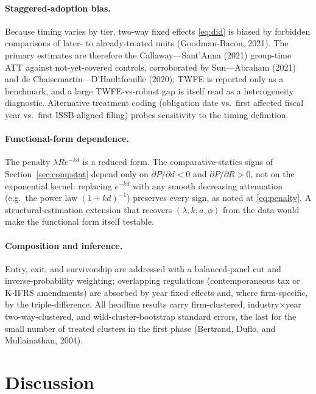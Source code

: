 \documentclass[11pt,a4paper]{article}
\begin{document}
\paragraph{Staggered-adoption bias.} Because timing varies by tier, two-way fixed effects \eqref{eq:did} is biased by forbidden comparisons of later- to already-treated units (Goodman-Bacon, 2021). The primary estimates are therefore the Callaway---Sant'Anna (2021) group-time ATT against not-yet-covered controls, corroborated by Sun---Abraham (2021) and de Chaisemartin---D'Haultf\oe uille (2020); TWFE is reported only as a benchmark, and a large TWFE-vs-robust gap is itself read as a heterogeneity diagnostic. Alternative treatment coding (obligation date vs.\ first affected fiscal year vs.\ first ISSB-aligned filing) probes sensitivity to the timing definition.

\paragraph{Functional-form dependence.} The penalty $\lambda R e^{-kd}$ is a reduced form. The comparative-statics signs of Section~\ref{sec:compstat} depend only on $\partial P/\partial d<0$ and $\partial P/\partial R>0$, not on the exponential kernel: replacing $e^{-kd}$ with any smooth decreasing attenuation (e.g.\ the power law $(1+kd)^{-1}$) preserves every sign, as noted at \eqref{eq:penalty}. A structural-estimation extension that recovers $(\lambda,k,a,\phi)$ from the data would make the functional form itself testable.

\paragraph{Composition and inference.} Entry, exit, and survivorship are addressed with a balanced-panel cut and inverse-probability weighting; overlapping regulations (contemporaneous tax or K-IFRS amendments) are absorbed by year fixed effects and, where firm-specific, by the triple-difference. All headline results carry firm-clustered, industry$\times$year two-way-clustered, and wild-cluster-bootstrap standard errors, the last for the small number of treated clusters in the first phase (Bertrand, Duflo, and Mullainathan, 2004).

\section{Discussion}
\label{sec:discussion}
\end{document}
